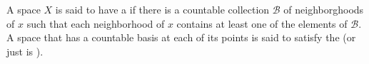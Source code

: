 \begin{defn}\label{defn:firstCountable}
A space $X$ is said to have a  if
there is a countable collection $\mathscr{B}$ of neighborghoods
of $x$ such that each neighborhood of $x$ contains at least one
of the elements of $\mathscr{B}$. A space that has a countable
basis at each of its points is said to satisfy the  (or just is ).
\end{defn}


